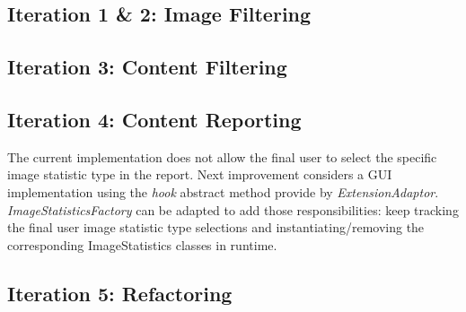 \subsection{Iteration 1 \& 2: Image Filtering}
\subsection{Iteration 3: Content Filtering}
\subsection{Iteration 4: Content Reporting}
The current implementation does not allow the final user to select the specific image statistic type in the report. Next improvement considers a GUI implementation using the \textit{hook} abstract method provide by \textit{ExtensionAdaptor}. \textit{ImageStatisticsFactory} can be adapted to add those responsibilities: keep tracking the final user image statistic type selections and instantiating/removing the corresponding ImageStatistics classes in runtime.

\subsection{Iteration 5: Refactoring}
